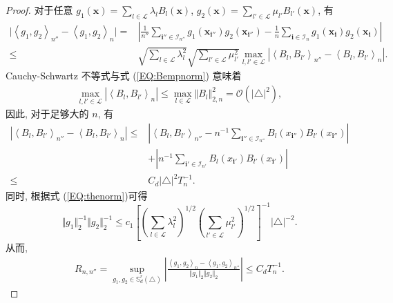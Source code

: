 \documentclass[a4paper,openay,14pt]{ctexbook}
\numberwithin{equation}{section}
\numberwithin{lem}{section}
\begin{document}
\begin{proof}
      对于任意 $g_1(\boldsymbol{x}) = \sum_{l\in\mathcal{L}}\lambda_l B_l(\boldsymbol{x})$, $g_2(\boldsymbol{x}) = \sum_{l'\in\mathcal{L}}\mu_{l'} B_{l'}(\boldsymbol{x})$, 有
      \begin{align*}
          \vert\left\langle g_1,g_2\right\rangle_{n''}-\left\langle g_1,g_2\right\rangle _{n}\vert 
          =&\left\vert \frac{1}{n''}\sum_{\mathbf{i}''\in\mathcal{I}_{n''}}g_1(\boldsymbol{x}_{\mathbf{i}''})g_2(\boldsymbol{x}_{\mathbf{i}''})-\frac{1}{n}\sum_{\mathbf{i}\in\mathcal{I}_n}g_1(\boldsymbol{x}_{\mathbf{i}})g_2(\boldsymbol{x}_{\mathbf{i}})\right\vert\\
          \le & \sqrt{\sum_{l\in \mathcal{L}}\lambda^2_{l}}\sqrt{\sum_{l'\in \mathcal{L}}\mu^2_{l'}} \max_{l,l' \in\mathcal{L}}\left \vert\left<B_l,B_{l'}\right>_{n''}-\left<B_l,B_{l'}\right>_{n}\right\vert. 
      \end{align*}
     Cauchy-Schwartz 不等式与式 (\ref{EQ:Bempnorm}) 意味着
     \begin{align*}
         \max_{l,l'\in\mathcal{L}}\left\vert\left<B_l,B_{l'}\right>_{n}\right\vert\leq \max_{l\in\mathcal{L}}\Vert B_l\Vert^2_{2,n} = \mathcal{O}(\vert\triangle\vert^2),
     \end{align*}
     因此, 对于足够大的 $n$, 有
     \begin{align*}
         \left\vert \left<B_l,B_{l'}\right>_{n''}-\left<B_l,B_{l'}\right>_{n}\right\vert
         \leq & \left\vert \left<B_l,B_{l'}\right>_{n''} - n^{-1}\sum_{\mathbf{i}''\in\mathcal{I}_{n''}}B_l(x_{\mathbf{i}''})B_{l'}(x_{\mathbf{i}''})\right\vert\\ 
         &+ \left\vert n^{-1}\sum_{\mathbf{i}'\in\mathcal{I}_{n'}}B_l(x_{\mathbf{i}'})B_{l'}(x_{\mathbf{i}'})\right\vert\\
         \leq & C_d\vert\triangle\vert^2 T_n^{-1}.
     \end{align*}     
     同时, 根据式 (\ref{EQ:thenorm})可得
     $$\Vert g_1\Vert_2^{-1}\Vert g_2\Vert_2^{-1} \leq c_1 \left[\left(\sum_{l\in\mathcal{L}}\lambda_l^2\right)^{1/2}\left(\sum_{l'\in\mathcal{L}}\mu_{l'}^2\right)^{1/2}\right]^{-1}\vert \triangle\vert^{-2}.$$
     从而,
     \begin{align*}
         R_{n,n''} = \sup_{g_1,g_2\in\mathbb{S}_{d}^{r}(\triangle)}\left\vert\frac{\left<g_1,g_2\right>_{n}-\left<g_1,g_2\right>_{n''}}{\Vert g_1\Vert_2\Vert g_2\Vert_2}\right\vert\leq C_d T_n^{-1}.
     \end{align*}


\end{proof}
\end{document}
